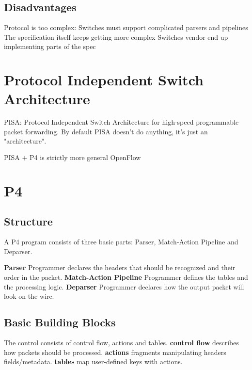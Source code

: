 \documentclass[a4paper, fontsize=8pt, landscape, DIV=1]{scrartcl}
\begin{document}
\begin{multicols*}{4}
  \subsection{Disadvantages}
  \begin{outline}
    \1 Protocol is too complex:
    Switches must support complicated parsers and pipelines
    \1 The specification itself keeps getting more complex
    \1 Switches vendor end up implementing parts of the spec
  \end{outline}

  \section{Protocol Independent Switch Architecture}
  PISA: Protocol Independent Switch Architecture for high-speed programmable
  packet forwarding. By default PISA doesn't do anything, it's just an "architecture".

  PISA + P4 is strictly more general OpenFlow

  \section{P4}
  \subsection{Structure}
  A P4 program consists of three basic parts: Parser, Match-Action Pipeline and
  Deparser. 

  \textbf{Parser} Programmer declares the headers that should be recognized and
  their order in the packet. 
  \textbf{Match-Action Pipeline} Programmer defines the tables and the processing
  logic.
  \textbf{Deparser} Programmer declares how the output packet will look on the wire.

  \subsection{Basic Building Blocks}
  The control consists of control flow, actions and tables.
  \textbf{control flow} describes how packets should be processed.
  \textbf{actions} fragments manipulating headers fields/metadata.
  \textbf{tables} map user-defined keys with actions.


\end{multicols*}
\end{document}
